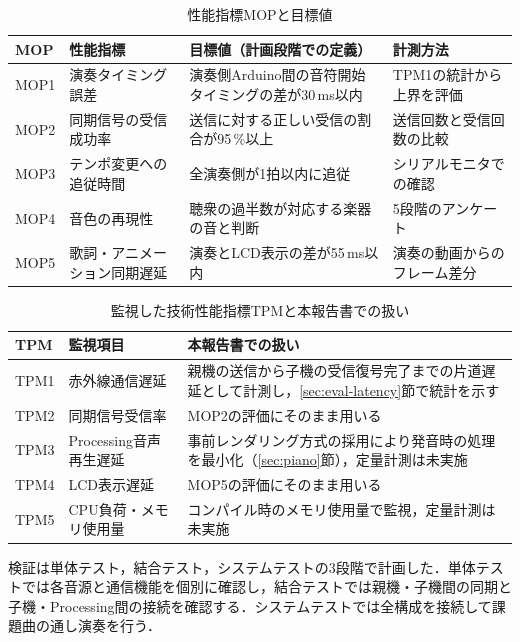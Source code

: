 \documentclass[uplatex,dvipdfmx]{jlreq}
\begin{document}
\begin{table}[tb]
\caption{性能指標MOPと目標値}
\label{tab:mop}
\begin{center}
\footnotesize
\begin{tabular}{llp{11em}p{10em}}
\hline
MOP & 性能指標 & 目標値（計画段階での定義） & 計測方法 \\
\hline
MOP1 & 演奏タイミング誤差 & 演奏側Arduino間の音符開始タイミングの差が30\,ms以内 & TPM1の統計から上界を評価 \\
MOP2 & 同期信号の受信成功率 & 送信に対する正しい受信の割合が95\,\%以上 & 送信回数と受信回数の比較 \\
MOP3 & テンポ変更への追従時間 & 全演奏側が1拍以内に追従 & シリアルモニタでの確認 \\
MOP4 & 音色の再現性 & 聴衆の過半数が対応する楽器の音と判断 & 5段階のアンケート \\
MOP5 & 歌詞・アニメーション同期遅延 & 演奏とLCD表示の差が55\,ms以内 & 演奏の動画からのフレーム差分 \\
\hline
\end{tabular}
\end{center}
\end{table}

\begin{table}[tb]
\caption{監視した技術性能指標TPMと本報告書での扱い}
\label{tab:tpm}
\begin{center}
\footnotesize
\begin{tabular}{llp{16em}}
\hline
TPM & 監視項目 & 本報告書での扱い \\
\hline
TPM1 & 赤外線通信遅延 & 親機の送信から子機の受信復号完了までの片道遅延として計測し，\ref{sec:eval-latency}節で統計を示す \\
TPM2 & 同期信号受信率 & MOP2の評価にそのまま用いる \\
TPM3 & Processing音声再生遅延 & 事前レンダリング方式の採用により発音時の処理を最小化（\ref{sec:piano}節），定量計測は未実施 \\
TPM4 & LCD表示遅延 & MOP5の評価にそのまま用いる \\
TPM5 & CPU負荷・メモリ使用量 & コンパイル時のメモリ使用量で監視，定量計測は未実施 \\
\hline
\end{tabular}
\end{center}
\end{table}

検証は単体テスト，結合テスト，システムテストの3段階で計画した．単体テストでは各音源と通信機能を個別に確認し，結合テストでは親機・子機間の同期と子機・Processing間の接続を確認する．システムテストでは全構成を接続して課題曲の通し演奏を行う．
\end{document}
